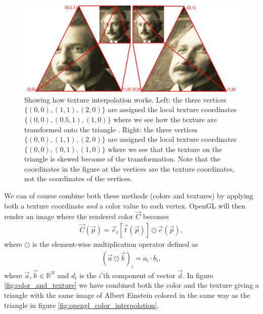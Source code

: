 \begin{figure}[h]
\begin{center}
\includegraphics[width=\textwidth, trim=0cm 0cm 0cm 0cm, clip]{opengl/figures/texture_interpolation.png}
\end{center}
\caption{Showing how texture interpolation works. Left: the three vertices $\{(0,0), (1,1), (2,0)\}$ are assigned the local texture coordinates $\{(0,0), (0.5,1), (1,0)\}$ where we see how the texture are transformed onto the triangle . Right: the three vertices $\{(0,0), (1,1), (2,0)\}$ are assigned the local texture coordinates $\{(0,0), (0,1), (1,0)\}$ where we see that the texture on the triangle is skewed because of the transformation. Note that the coordinates in the figure at the vertices are the texture coordinates, not the coordinates of the vertices.}
\label{fig:opengl_texture_interpolation}
\end{figure}
We can of course combine both these methods (colors and textures) by applying both a texture coordinate \textit{and} a color value to each vertex. OpenGL will then render an image where the rendered color $\vec C$ becomes
\begin{align}
	\label{eq:opengl_combining_colors_textures}
	\vec C(\vec p) = \vec c_t[\vec t(\vec p)] \odot \vec c(\vec p),
\end{align}
where $\odot$ is the element-wise multiplication operator defined as
\begin{align}
	(\vec a \odot \vec b)_i = a_i\cdot b_i,
\end{align}
where $\vec a,\vec b \in \mathbb{R}^N$ and $d_i$ is the $i$'th component of vector $\vec d$. In figure \ref{fig:color_and_texture} we have combined both the color and the texture giving a triangle with the same image of Albert Einstein colored in the same way as the triangle in figure \ref{fig:opengl_color_interpolation}.
